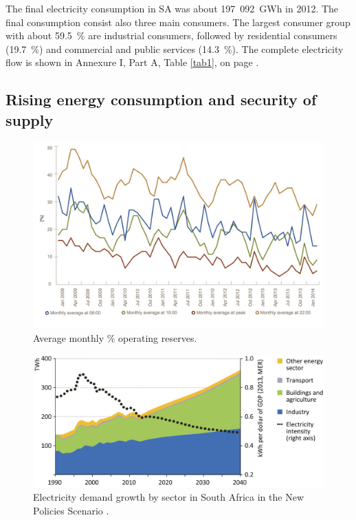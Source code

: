The final electricity consumption in SA was about 197~092~GWh in 2012. The final consumption consist also three main consumers. The largest consumer group with about 59.5~\% are industrial consumers, followed by residential consumers (19.7~\%) and commercial and public services (14.3~\%). The complete electricity flow is shown in Annexure I, Part A, Table \ref{tab1}, on page \pageref{tab1}. \cite{Agency2015}

\subsection{Rising energy consumption and security of supply}

\begin{figure}[!h] %
\centering
\includegraphics[width=0.9\linewidth]{FIG/AveragemonthlySA}
\caption[Average monthly \% operating reserves.]{Average monthly \% operating reserves\cite{Eskom2014}.}\label{Abb1}
\end{figure}


\begin{figure}[!h] %
\centering
\includegraphics[width=0.9\linewidth]{FIG/SA_Electricity_demand_growth}
\caption[Electricity demand growth by sector in South Africa in the New Policies Scenario.]{Electricity demand growth by sector in South Africa in the New Policies Scenario \cite{IEA2014f}.}\label{Abb1}
\end{figure}

